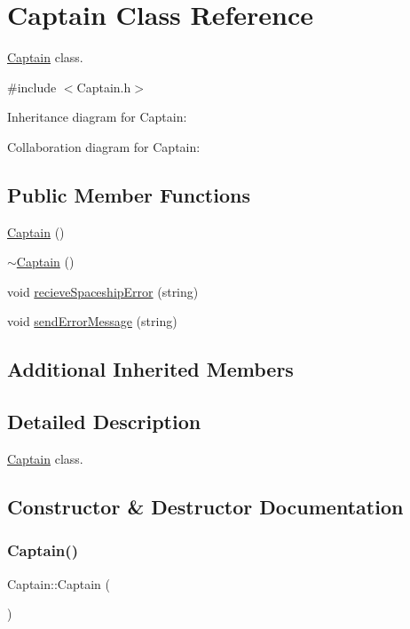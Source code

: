 \hypertarget{classCaptain}{}\section{Captain Class Reference}
\label{classCaptain}


\hyperlink{classCaptain}{Captain} class.  




{\ttfamily \#include $<$Captain.\+h$>$}



Inheritance diagram for Captain\+:


Collaboration diagram for Captain\+:
\subsection*{Public Member Functions}
\begin{DoxyCompactItemize}
\item 
\hyperlink{classCaptain_a097ac4126a1320400460628a3ed2f376}{Captain} ()
\item 
\hyperlink{classCaptain_a6b8671d624f45a11b7fd33f5ff9a6930}{$\sim$\+Captain} ()
\item 
void \hyperlink{classCaptain_a39ebd40ec094b410f295188bb6262009}{recieve\+Spaceship\+Error} (string)
\item 
void \hyperlink{classCaptain_a88abc1940bcdef8a655efc20ebd68d50}{send\+Error\+Message} (string)
\end{DoxyCompactItemize}
\subsection*{Additional Inherited Members}


\subsection{Detailed Description}
\hyperlink{classCaptain}{Captain} class. 

\subsection{Constructor \& Destructor Documentation}
\mbox{\label{classCaptain_a097ac4126a1320400460628a3ed2f376}} 
\subsubsection{\texorpdfstring{Captain()}{Captain()}}
{\footnotesize\ttfamily Captain\+::\+Captain (\begin{DoxyParamCaption}{ }\end{DoxyParamCaption})\hspace{0.3cm}{\ttfamily [inline]}}


